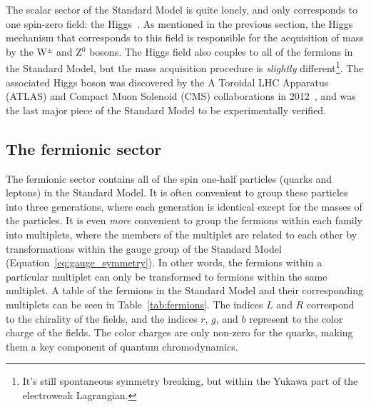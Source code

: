 The scalar sector of the Standard Model is quite lonely, and only corresponds to one spin-zero field: the Higgs~\cite{HiggsPaper}. As mentioned in the previous section, the Higgs mechanism that corresponds to this field is responsible for the acquisition of mass by the W$^{\pm}$ and Z$^{0}$ bosons. The Higgs field also couples to all of the fermions in the Standard Model, but the mass acquisition procedure is \textit{slightly} different\footnote{It's still spontaneous symmetry breaking, but within the Yukawa part of the electroweak Lagrangian.}. The associated Higgs boson was discovered by the A Toroidal LHC Apparatus (ATLAS) and Compact Muon Solenoid (CMS) collaborations in 2012~\cite{HiggsDiscovery1, HiggsDiscovery2}, and was the last major piece of the Standard Model to be experimentally verified.


\subsection{The fermionic sector}
\label{sec:fermion_fields}

The fermionic sector contains all of the spin one-half particles (quarks and leptons) in the Standard Model. It is often convenient to group these particles into three generations, where each generation is identical except for the masses of the particles. It is even \textit{more} convenient to group the fermions within each family into multiplets, where the members of the multiplet are related to each other by transformations within the gauge group of the Standard Model (Equation~\ref{eq:gauge_symmetry}). In other words, the fermions within a particular multiplet can only be transformed to fermions within the same multiplet. A table of the fermions in the Standard Model and their corresponding multiplets can be seen in Table~\ref{tab:fermions}. The indices $L$ and $R$ correspond to the chirality of the fields, and the indices $r$, $g$, and $b$ represent to the color charge of the fields. The color charges are only non-zero for the quarks, making them a key component of quantum chromodynamics.


